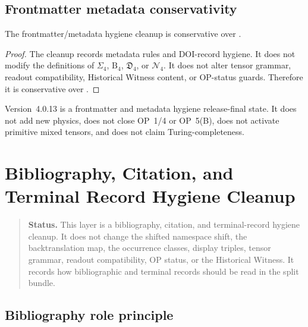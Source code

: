 \subsection{Frontmatter metadata conservativity}
\label{subsec:v407-frontmatter-metadata-conservativity}

\begin{theorem}
\label{thm:v407-frontmatter-metadata-conservativity}
The  frontmatter/metadata hygiene cleanup is conservative over .
\end{theorem}

\begin{proof}
The cleanup records metadata rules and DOI-record hygiene. It does not modify
the definitions of $\Sigma_4$, $\mathrm B_4$, $\mathfrak D_4$, or
$\mathcal N_4$. It does not alter tensor grammar, readout compatibility,
Historical Witness content, or OP-status guards. Therefore it is conservative
over .
\end{proof}

\begin{remark}
\label{rem:v407-non-claim}
Version~4.0.13 is a frontmatter and metadata hygiene release-final state. It does not add
new physics, does not close OP~1/4 or OP~5(B), does not activate primitive
mixed tensors, and does not claim Turing-completeness.
\end{remark}



\clearpage
\section{ Bibliography, Citation, and Terminal Record Hygiene Cleanup}
\label{sec:v408-bibliography-citation-terminal-record-hygiene-cleanup}

\begin{quote}\small
\noindent\textbf{Status.}
This  layer is a bibliography, citation, and terminal-record hygiene
cleanup. It does not change the shifted namespace shift, the backtranslation map,
the occurrence classes, display triples, tensor grammar, readout compatibility,
OP status, or the Historical Witness. It records how bibliographic and
terminal records should be read in the split bundle.
\end{quote}

\subsection{Bibliography role principle}
\label{subsec:v408-bibliography-role-principle}

